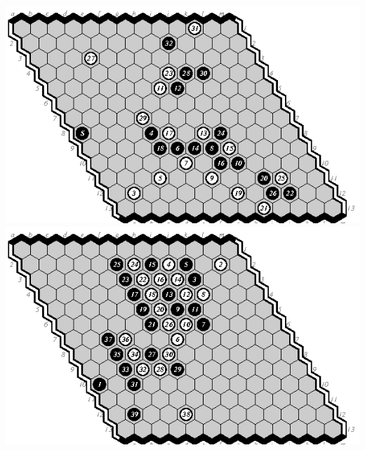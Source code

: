 \documentclass{icga}
\begin{document}
\newpage
\includegraphics[scale=1.3]{13.01e-m.swap.eps}\hspace*{-2.5cm}\includegraphics[scale=1.3]{13.02d-e.eps}
\end{document}
